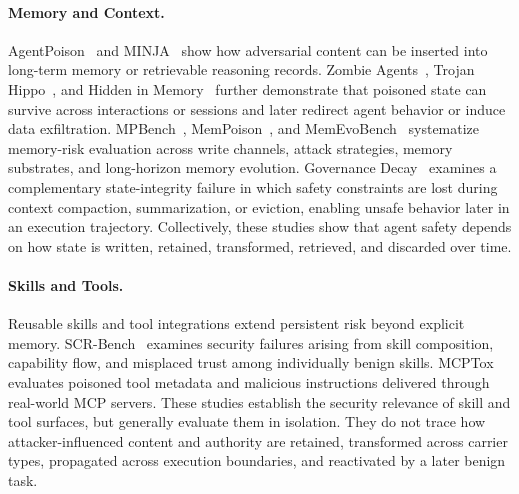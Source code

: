 \documentclass[letterpaper]{article} %
\begin{document}
\paragraph{Memory and Context.}
AgentPoison~\cite{chen2024agentpoison} and MINJA~\cite{dong2025minja} show how adversarial content can be inserted into long-term memory or retrievable reasoning records. Zombie Agents~\cite{yang2026zombieagents}, Trojan Hippo~\cite{das2026trojanhippo}, and Hidden in Memory~\cite{pulipaka2026hidden} further demonstrate that poisoned state can survive across interactions or sessions and later redirect agent behavior or induce data exfiltration. MPBench~\cite{dash2026from}, MemPoison~\cite{gao2026mempoison}, and MemEvoBench~\cite{xie2026memevobench} systematize memory-risk evaluation across write channels, attack strategies, memory substrates, and long-horizon memory evolution. Governance Decay~\cite{chen2026governancedecay} examines a complementary state-integrity failure in which safety constraints are lost during context compaction, summarization, or eviction, enabling unsafe behavior later in an execution trajectory. Collectively, these studies show that agent safety depends on how state is written, retained, transformed, retrieved, and discarded over time.

\paragraph{Skills and Tools.}
Reusable skills and tool integrations extend persistent risk beyond explicit memory. SCR-Bench~\cite{xie2026scrbench} examines security failures arising from skill composition, capability flow, and misplaced trust among individually benign skills. MCPTox~\cite{wang2026mcptox} evaluates poisoned tool metadata and malicious instructions delivered through real-world MCP servers. These studies establish the security relevance of skill and tool surfaces, but generally evaluate them in isolation. They do not trace how attacker-influenced content and authority are retained, transformed across carrier types, propagated across execution boundaries, and reactivated by a later benign task.


\end{document}
